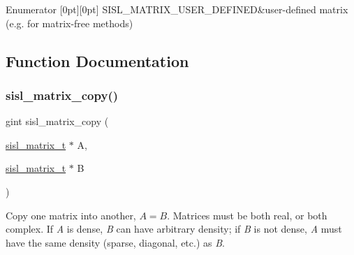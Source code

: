\begin{DoxyEnumFields}{Enumerator}
[0pt][0pt]{}\mbox{\label{group__matrix_ggae50d4f05ed96de495bdd326c201c28ffa64a3cff2469cac8f45575896e548611c}} 
S\+I\+S\+L\+\_\+\+M\+A\+T\+R\+I\+X\+\_\+\+U\+S\+E\+R\+\_\+\+D\+E\+F\+I\+N\+ED&user-\/defined matrix (e.\+g. for matrix-\/free methods) \\
\hline

\end{DoxyEnumFields}


\subsection{Function Documentation}
\mbox{\label{group__matrix_ga76214ff23ddf1c1175d918868ba29b97}} 
\subsubsection{\texorpdfstring{sisl\+\_\+matrix\+\_\+copy()}{sisl\_matrix\_copy()}}
{\footnotesize\ttfamily gint sisl\+\_\+matrix\+\_\+copy (\begin{DoxyParamCaption}\item[{\mbox{\hyperlink{group__matrix_gad147923587b355644defb9bfbf981740}{sisl\+\_\+matrix\+\_\+t}} $\ast$}]{A,  }\item[{\mbox{\hyperlink{group__matrix_gad147923587b355644defb9bfbf981740}{sisl\+\_\+matrix\+\_\+t}} $\ast$}]{B }\end{DoxyParamCaption})}

Copy one matrix into another, $A=B$. Matrices must be both real, or both complex. If {\itshape A} is dense, {\itshape B} can have arbitrary density; if {\itshape B} is not dense, {\itshape A} must have the same density (sparse, diagonal, etc.) as {\itshape B}.


